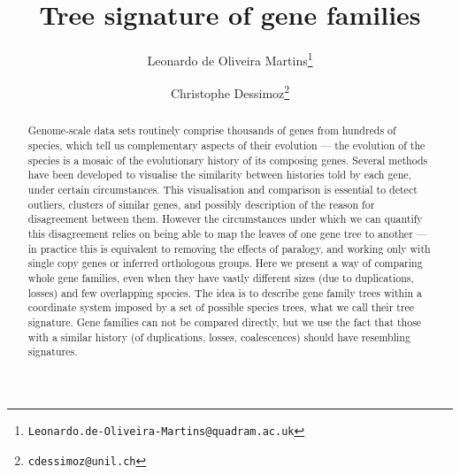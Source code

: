 \documentclass[pdftex,12pt,a4paper,openany,fleqn]{article}
\title{Tree signature of gene families}
\author[1]{Leonardo de Oliveira Martins\thanks{{\tt Leonardo.de-Oliveira-Martins@quadram.ac.uk}}}
\author[2,3]{Christophe Dessimoz\thanks{{\tt cdessimoz@unil.ch}}}
\affil[1]{Quadram Institute Biosciences, Norwich, NR4 7UQ, UK}
\affil[2]{UNIL}
\affil[3]{UCL}
\date{\vspace{-5ex}}
\begin{document}
\maketitle

\begin{abstract}
Genome-scale data sets routinely comprise thousands of genes from hundreds of species, which tell us complementary
aspects of their evolution --- the evolution of the species is a mosaic of the evolutionary history of its composing
genes.
Several methods have been developed to visualise the similarity between histories told by each gene, under certain
circumstances.
This visualisation and comparison is essential to detect outliers, clusters of similar genes, and possibly description
of the reason for disagreement between them.
However the circumstances under which we can quantify this disagreement relies on being able to map 
the leaves of one gene tree to another --- in practice this is equivalent to removing the effects of paralogy, and
working only with single copy genes or inferred orthologous groups.
Here we present a way of comparing whole gene families, even when they have vastly different sizes (due to duplications,
losses) and few overlapping species. 
The idea is to describe gene family trees within a coordinate system imposed by a set of possible species trees, what we
call their tree signature.
Gene families can not be compared directly, but we use the fact that those with a similar history (of duplications,
losses, coalescences) should have resembling signatures.
\end{abstract}






\begin{spacing}{0.8}  \end{spacing}
\end{document}
